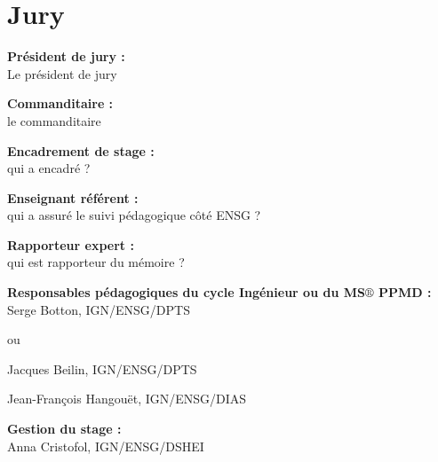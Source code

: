 \thispagestyle{plain}
\section*{Jury}
\vspace{0.5cm}

\textbf{Président de jury :} \\

Le président de jury

\vspace{0.5cm}

\textbf{Commanditaire :} \\

le commanditaire

\vspace{0.5cm}

\textbf{Encadrement de stage :} \\ 


qui a encadré ?

\vspace{0.5cm}

\textbf{Enseignant référent :} \\ 

qui a assuré le suivi pédagogique côté ENSG ?

\vspace{0.5cm}

\textbf{Rapporteur expert :} \\ 

qui est rapporteur du mémoire ?

\vspace{0.5cm}

\textbf{Responsable{\color{magenta}s} pédagogique{\color{magenta}s} du {\color{red} cycle Ingénieur} ou du {\color{magenta}MS$\circledR$ PPMD} :} \\



{\color{red}Serge Botton, IGN/ENSG/DPTS}

ou 

{\color{magenta}
Jacques Beilin, IGN/ENSG/DPTS

Jean-François Hangouët, IGN/ENSG/DIAS
}

\vspace{0.5cm}

\textbf{Gestion du stage :} \\ 

Anna Cristofol, IGN/ENSG/DSHEI

\vspace{0.5cm}


